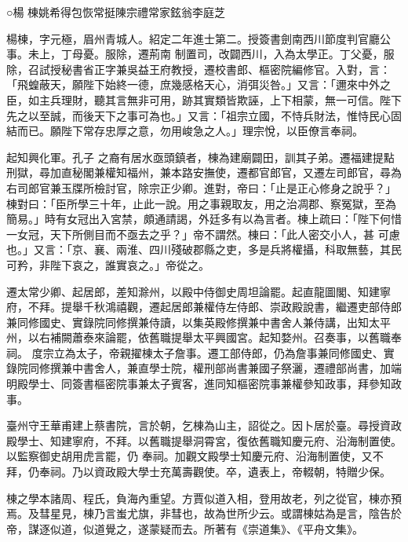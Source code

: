 
\begin{pinyinscope}

 ○楊
 棟姚希得包恢常挺陳宗禮常家鉉翁李庭芝



 楊棟，字元極，眉州青城人。紹定二年進士第二。授簽書劍南西川節度判官廳公事。未上，丁母憂。服除，遷荊南
 制置司，改闢西川，入為太學正。丁父憂，服除，召試授秘書省正字兼吳益王府教授，遷校書郎、樞密院編修官。入對，言：「飛蝗蔽天，願陛下始終一德，庶幾感格天心，消弭災咎。」又言：「邇來中外之臣，如主兵理財，聽其言無非可用，跡其實類皆欺誣，上下相蒙，無一可信。陛下先之以至誠，而後天下之事可為也。」又言：「祖宗立國，不恃兵財法，惟恃民心固結而已。願陛下常存忠厚之意，勿用峻急之人。」理宗悅，以臣僚言奉祠。



 起知興化軍。孔子
 之裔有居水亟頭鎮者，棟為建廟闢田，訓其子弟。遷福建提點刑獄，尋加直秘閣兼權知福州，兼本路安撫使，遷都官郎官，又遷左司郎官，尋為右司郎官兼玉牒所檢討官，除宗正少卿。進對，帝曰：「止是正心修身之說乎？」棟對曰：「臣所學三十年，止此一說。用之事親取友，用之治凋郡、察冤獄，至為簡易。」時有女冠出入宮禁，頗通請謁，外廷多有以為言者。棟上疏曰：「陛下何惜一女冠，天下所側目而不亟去之乎？」帝不謂然。棟曰：「此人密交小人，甚
 可慮也。」又言：「京、襄、兩淮、四川殘破郡縣之吏，多是兵將權攝，科取無藝，其民可矜，非陛下哀之，誰實哀之。」帝從之。



 遷太常少卿、起居郎，差知滁州，以殿中侍御史周坦論罷。起直龍圖閣、知建寧府，不拜。提舉千秋鴻禧觀，遷起居郎兼權侍左侍郎、崇政殿說書，繼遷吏部侍郎兼同修國史、實錄院同修撰兼侍讀，以集英殿修撰兼中書舍人兼侍講，出知太平州，以右補闕蕭泰來論罷，依舊職提舉太平興國宮。起知婺州。召奏事，以舊職奉祠。
 度宗立為太子，帝親擢棟太子詹事。遷工部侍郎，仍為詹事兼同修國史、實錄院同修撰兼中書舍人，兼直學士院，權刑部尚書兼國子祭灑，遷禮部尚書，加端明殿學士、同簽書樞密院事兼太子賓客，進同知樞密院事兼權參知政事，拜參知政事。



 臺州守王華甫建上蔡書院，言於朝，乞棟為山主，詔從之。因卜居於臺。尋授資政殿學士、知建寧府，不拜。以舊職提舉洞霄宮，復依舊職知慶元府、沿海制置使。以監察御史胡用虎言罷，仍
 奉祠。加觀文殿學士知慶元府、沿海制置使，又不拜，仍奉祠。乃以資政殿大學士充萬壽觀使。卒，遺表上，帝輟朝，特贈少保。



 棟之學本諸周、程氏，負海內重望。方賈似道入相，登用故老，列之從官，棟亦預焉。及彗星見，棟乃言蚩尤旗，非彗也，故為世所少云。或謂棟姑為是言，陰告於帝，謀逐似道，似道覺之，遂蒙疑而去。所著有《崇道集》、《平舟文集》。




\end{pinyinscope}
